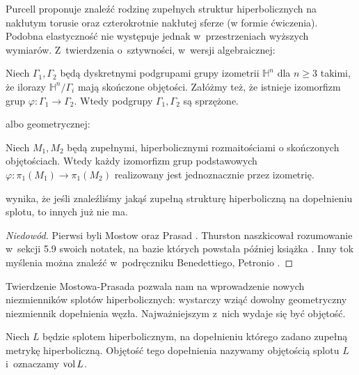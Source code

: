 
Purcell \cite[s. 66]{purcell2020} proponuje znaleźć rodzinę zupełnych struktur hiperbolicznych na nakłutym torusie oraz czterokrotnie nakłutej sferze (w formie ćwiczenia).
Podobna elastyczność nie występuje jednak w~przestrzeniach wyższych wymiarów.
Z~twierdzenia o~sztywności, w~wersji algebraicznej:

\begin{theorem}
    Niech $\Gamma_1, \Gamma_2$ będą dyskretnymi podgrupami grupy izometrii $\mathbb H^n$ dla $n \ge 3$ takimi, że ilorazy $\mathbb H^n/\Gamma_i$ mają skończone objętości.
    Załóżmy też, że istnieje izomorfizm grup $\varphi \colon \Gamma_1 \to \Gamma_2$.
    Wtedy podgrupy $\Gamma_1, \Gamma_2$ są sprzężone.
\end{theorem}

albo geometrycznej:

\begin{theorem}
    Niech $M_1, M_2$ będą zupełnymi, hiperbolicznymi rozmaitościami o skończonych objętościach.
    Wtedy każdy izomorfizm grup podstawowych $\varphi \colon \pi_1(M_1) \to \pi_1(M_2)$ realizowany jest jednoznacznie przez izometrię.
\end{theorem}

wynika, że jeśli znaleźliśmy jakąś zupełną strukturę hiperboliczną na dopełnieniu splotu, to innych już nie ma.

\begin{proof}[Niedowód]
%
%
%
%
%
Pierwsi byli Mostow \cite{mostow1973} oraz Prasad \cite{prasad1973}.
    Thurston naszkicował rozumowanie w~sekcji 5.9 swoich notatek, na bazie których powstała później książka \cite{thurston1997}.
    Inny tok myślenia można znaleźć w~podręczniku Benedettiego, Petronio \cite[rozdział C]{benedetti1992}.
\end{proof}

Twierdzenie Mostowa-Prasada pozwala nam na wprowadzenie nowych niezmienników splotów hiperbolicznych: wystarczy wziąć dowolny geometryczny niezmiennik dopełnienia węzła.
Najważniejszym z~nich wydaje się być objętość.

%
\begin{definition}[objętość]
    Niech $L$ będzie splotem hiperbolicznym, na dopełnieniu którego zadano zupełną metrykę hiperboliczną.
    Objętość tego dopełnienia nazywamy objętością splotu $L$ i~oznaczamy $\operatorname{vol} L$.
\end{definition}

